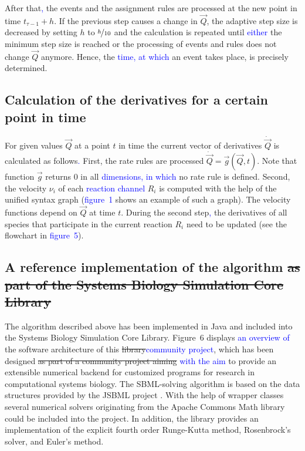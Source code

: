 \documentclass[10pt]{bmc_article}
\newenvironment{bmcformat}{\fussy\setboolean{publ}{true}}{\fussy}
\newcommand{\COR}[1]                      {\textcolor{blue}{#1}}
\begin{document}
\begin{bmcformat}
After that\COR{,} the events and the assignment rules are processed at the new point in
time $t_{\tau - 1} + h$.
If the previous step causes a change in $\vec{Q}$, the adaptive step size is
decreased by setting $h$ to $\nicefrac{h}{10}$ and the calculation is repeated
until \COR{either} the minimum step size is reached or the processing of events and rules
does not change $\vec{Q}$ anymore.
Hence, the \COR{time, at which} an event takes place, is precisely determined.

\subsection*{Calculation of the derivatives for a certain point in time}
For given values $\vec{Q}$ at a point $t$ in time the current vector of derivatives $\dot{\vec{Q}}$ is calculated as follows\COR{.}
First, the rate rules are processed $\dot{\vec{Q}} = \vec{g}(\vec{Q}, t)$. Note that function $\vec{g}$ returns 0 in all \COR{dimensions,
in which} no rate rule is defined.
Second, the velocity $\nu_i$ of each \COR{reaction channel} $R_i$ is computed with the help of the unified syntax graph (\COR{figure~1} shows an example of such a graph).
The velocity functions depend on $\vec{Q}$ at time $t$.
During the second step\COR{,} the derivatives of all species that participate in the current reaction $R_i$ need to be updated (see the flowchart in \COR{figure~5}).

\subsection*{A reference implementation of the algorithm \sout{as part of the Systems
Biology Simulation Core Library}}

The algorithm described above has been implemented in Java\texttrademark{} and
included into the Systems Biology Simulation Core Library.
Figure~6 displays \COR{an overview of} the software architecture of this \sout{library}\COR{community project},
which has been designed 
\sout{as part of a community project aiming}
\COR{with the aim}
to provide an extensible numerical backend for customized programs for research in computational systems biology.
The \acs{SBML}-solving algorithm is based on the data structures provided by the JSBML
project \cite{Draeger2008}.
With the help of wrapper classes several numerical solvers originating from the
Apache Commons Math library \COR{\cite{ApacheCommonsMath2013}} could be included into the project.
In addition, the library provides an implementation of the explicit fourth order
Runge-Kutta method, Rosenbrock's solver, and Euler's method.


\end{bmcformat}
\end{document}
